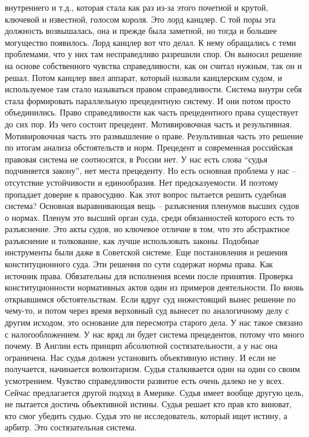 \documentclass[a4paper, 12pt]{article}
\begin{document}
внутреннего и т.д., которая стала как раз из-за этого почетной и крутой, ключевой и известной, голосом короля. Это лорд канцлер. С той поры эта должность возвышалась, она и прежде была заметной, но тогда и большее могущество появилось. Лорд канцлер вот что делал. К нему обращались с теми проблемами, что у них там несправедливо разрешили спор. Он выносил решение на основе собственного чувства справедливости, как он считал нужным, так он и решал. Потом канцлер ввел аппарат, который назвали канцлерским судом, и используемое там стало называться правом справедливости. Система внутри себя стала формировать параллельную прецедентную систему. И они потом просто объединились. Право справедливости как часть прецедентного права существует до сих пор. Из чего состоит прецедент. Мотивировочная часть и результивная. Мотивировочная часть это размышление о праве. Результивная часть это решение по итогам анализа обстоятельств и норм. Прецедент и современная российская правовая система не соотносятся, в России нет. У нас есть слова ``судья подчиняется закону'', нет места прецеденту. Но есть основная проблема у нас -- отсутствие устойчивости и единообразия. Нет предсказуемости. И поэтому пропадает доверие к правосудию. Как этот вопрос пытается решить судебная система? Основная выравнивающая вещь -- разъяснения пленумов высших судов о нормах. Пленум это высший орган суда, среди обязанностей которого есть то разъяснение. Это акты судов, но ключевое отличие в том, что это абстрактное разъяснение и толкование, как лучше использовать законы. Подобные инструменты были даже в Советской системе. Еще постановления и решения конституционного суда. Эти решения по сути содержат нормы права. Как источник права. Обязательны для исполнения всеми после принятия. Проверка конституционности нормативных актов один из примеров деятельности. По вновь открывшимся обстоятельствам. Если вдруг суд нижестоящий вынес решение по чему-то, и потом через время верховный суд вынесет по аналогичному делу с другим исходом, это основание для пересмотра старого дела. У нас такое связано с налогообложением. У нас вряд ли будет система прецедентов, потому что много почему. В Англии есть принцип абсолютной состязательности, а у нас она ограничена. Нас судья должен установить объективную истину. И если не получается, начинается волюнтаризм. Судья сталкивается один на один со своим усмотрением. Чувство справедливости развитое есть очень далеко не у всех. Сейчас предлагается другой подход в Америке. Судья имеет вообще другую цель, не пытается достичь объективной истины. Судья решает кто прав кто виноват, кто смог убедить судью. Судья это не исследователь, который ищет истину, а арбитр. Это состязательная система. 
\end{document}
